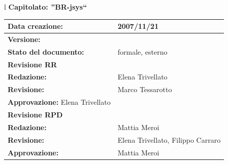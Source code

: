 \documentclass[11pt,titlepage,a4paper]{report}
\begin{document}
\begin{center}
\thispagestyle{plain}
\begin{table}[htbp]
\large{
\begin{tabular}{l}
\Large{\textbf{\textsf{Capitolato: ''BR-jsys``}}} \\
\begin{tabular}{||p{6cm}||p{6cm}||} \hline
\textbf{Data creazione:} & 2007/11/21 \\ \hline
\textbf{Versione:} & \lv \\ \hline
\textbf{Stato del documento:} & formale, esterno \\ \hline
\textbf{Revisione RR} &           \\ \hline
\textbf{Redazione:} & Elena Trivellato \\ \hline
\textbf{Revisione:} & Marco Tessarotto \\ \hline
\textbf{Approvazione:} Elena Trivellato & \\ \hline
\textbf{Revisione RPD}     \\ \hline
\textbf{Redazione:} & Mattia Meroi \\ \hline
\textbf{Revisione:} & Elena Trivellato, Filippo Carraro \\ \hline
\textbf{Approvazione:}  & Mattia Meroi \\ \hline
\end{tabular} \\
\end{tabular}
}
\end{table}


\end{center}
\end{document}
